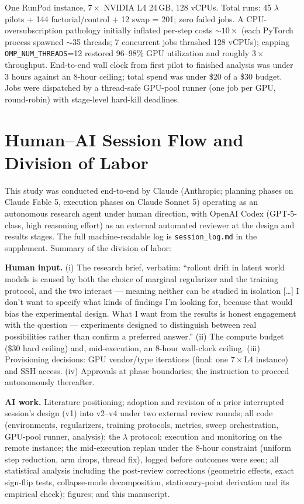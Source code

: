 One RunPod instance, $7\times$ NVIDIA L4 24\,GB, 128 vCPUs. Total runs: 45 $\lambda$ pilots + 144 factorial/control + 12 swap = 201; zero failed jobs. A CPU-oversubscription pathology initially inflated per-step costs $\sim$$10\times$ (each PyTorch process spawned $\sim$35 threads; 7 concurrent jobs thrashed 128 vCPUs); capping \texttt{OMP\_NUM\_THREADS}=12 restored 96--98\% GPU utilization and roughly $3\times$ throughput. End-to-end wall clock from first pilot to finished analysis was under 3 hours against an 8-hour ceiling; total spend was under \$20 of a \$30 budget. Jobs were dispatched by a thread-safe GPU-pool runner (one job per GPU, round-robin) with stage-level hard-kill deadlines.

\section{Human--AI Session Flow and Division of Labor}
\label{app:session}

This study was conducted end-to-end by Claude (Anthropic; planning phases on Claude Fable 5, execution phases on Claude Sonnet 5) operating as an autonomous research agent under human direction, with OpenAI Codex (GPT-5-class, high reasoning effort) as an external automated reviewer at the design and results stages. The full machine-readable log is \texttt{session\_log.md} in the supplement. Summary of the division of labor:

\textbf{Human input.} (i) The research brief, verbatim: ``rollout drift in latent world models is caused by both the choice of marginal regularizer and the training protocol, and the two interact --- meaning neither can be studied in isolation [\dots] I don't want to specify what kinds of findings I'm looking for, because that would bias the experimental design. What I want from the results is honest engagement with the question --- experiments designed to distinguish between real possibilities rather than confirm a preferred answer.'' (ii) The compute budget (\$30 hard ceiling) and, mid-execution, an 8-hour wall-clock ceiling. (iii) Provisioning decisions: GPU vendor/type iterations (final: one $7\times$L4 instance) and SSH access. (iv) Approvals at phase boundaries; the instruction to proceed autonomously thereafter.

\textbf{AI work.} Literature positioning; adoption and revision of a prior interrupted session's design (v1) into v2--v4 under two external review rounds; all code (environments, regularizers, training protocols, metrics, sweep orchestration, GPU-pool runner, analysis); the $\lambda$ protocol; execution and monitoring on the remote instance; the mid-execution replan under the 8-hour constraint (uniform step reduction, arm drops, thread fix), logged before outcomes were seen; all statistical analysis including the post-review corrections (geometric effects, exact sign-flip tests, collapse-mode decomposition, stationary-point derivation and its empirical check); figures; and this manuscript.

